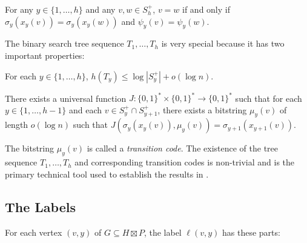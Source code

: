 \documentclass{patmorin}
\begin{document}
\begin{compactenum}[(P1)]\setcounter{enumi}{3}
    \item For any $y\in\{1,\ldots,h\}$ and any $v,w\in S^+_h$, $v=w$ if and only if $\sigma_y(x_y(v))= \sigma_y(x_y(w)) $ and $\psi_y(v)=\psi_y(w)$.\label{unique-match}
\end{compactenum}

The binary search tree sequence $T_1,\ldots,T_h$ is very special because it has two important properties:
\begin{compactenum}[(P1)]\setcounter{enumi}{4}
    \item For each $y\in\{1,\ldots,h\}$, $h(T_y)\le \log|S^+_y|+o(\log n)$.\label{tree-height}
    \item There exists a universal function $J:\{0,1\}^*\times\{0,1\}^*\to\{0,1\}^*$ such that for each $y\in\{1,\ldots,h-1\}$ and each $v\in S^+_y\cap S^+_{y+1}$, there exists a bitstring $\mu_y(v)$ of length $o(\log n)$ such that $J(\sigma_{y}(x_y(v)),\mu_y(v))=\sigma_{y+1}(x_{y+1}(v))$. \label{transition-code-v}
\end{compactenum}
The bitstring $\mu_y(v)$ is called a \emph{transition code}.  The existence of the tree sequence $T_1,\ldots,T_h$ and corresponding transition codes is non-trivial and is the primary technical tool used to establish the results in \cite{dujmovic.esperet.ea:adjacency,esperet.joret.ea:sparse}.

\subsection{The Labels}
\label{labels-i}

For each vertex $(v,y)$ of $G\subseteq H\boxtimes P$, the label $\ell(v,y)$ has these parts:
\end{document}
